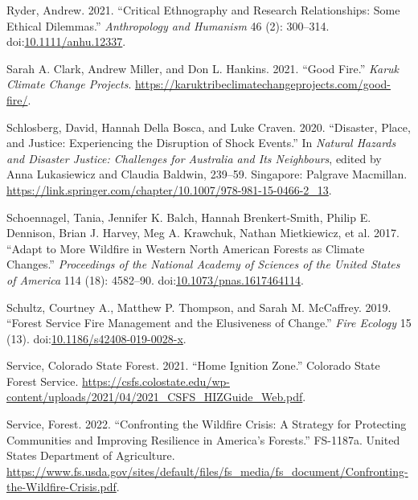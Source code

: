 \documentclass[
]{article}
\newlength{\cslhangindent}
\newenvironment{CSLReferences}[2] %
 {\begin{list}{}{%
  \setlength{\itemindent}{0pt}
  \setlength{\leftmargin}{0pt}
  \setlength{\parsep}{0pt}
  \ifodd #1
   \setlength{\leftmargin}{\cslhangindent}
   \setlength{\itemindent}{-1\cslhangindent}
  \fi
  \setlength{\itemsep}{#2\baselineskip}}}
 {\end{list}}
\begin{document}
\begin{CSLReferences}{1}{0}
Ryder, Andrew. 2021. {``Critical {Ethnography} and {Research Relationships}: {Some Ethical Dilemmas}.''} \emph{Anthropology and Humanism} 46 (2): 300--314. doi:\href{https://doi.org/10.1111/anhu.12337}{10.1111/anhu.12337}.

Sarah A. Clark, Andrew Miller, and Don L. Hankins. 2021. {``Good {Fire}.''} \emph{Karuk Climate Change Projects}. \url{https://karuktribeclimatechangeprojects.com/good-fire/}.

Schlosberg, David, Hannah Della Bosca, and Luke Craven. 2020. {``Disaster, {Place}, and {Justice}: {Experiencing} the {Disruption} of {Shock Events}.''} In \emph{Natural {Hazards} and {Disaster Justice}: {Challenges} for {Australia} and {Its Neighbours}}, edited by Anna Lukasiewicz and Claudia Baldwin, 239--59. Singapore: Palgrave Macmillan. \url{https://link.springer.com/chapter/10.1007/978-981-15-0466-2_13}.

Schoennagel, Tania, Jennifer K. Balch, Hannah Brenkert-Smith, Philip E. Dennison, Brian J. Harvey, Meg A. Krawchuk, Nathan Mietkiewicz, et al. 2017. {``Adapt to More Wildfire in Western {North American} Forests as Climate Changes.''} \emph{Proceedings of the National Academy of Sciences of the United States of America} 114 (18): 4582--90. doi:\href{https://doi.org/10.1073/pnas.1617464114}{10.1073/pnas.1617464114}.

Schultz, Courtney A., Matthew P. Thompson, and Sarah M. McCaffrey. 2019. {``Forest {Service} Fire Management and the Elusiveness of Change.''} \emph{Fire Ecology} 15 (13). doi:\href{https://doi.org/10.1186/s42408-019-0028-x}{10.1186/s42408-019-0028-x}.

Service, Colorado State Forest. 2021. {``Home {Ignition Zone}.''} Colorado State Forest Service. \url{https://csfs.colostate.edu/wp-content/uploads/2021/04/2021_CSFS_HIZGuide_Web.pdf}.

Service, Forest. 2022. {``Confronting the {Wildfire Crisis}: {A Strategy} for {Protecting Communities} and {Improving Resilience} in {America}'s {Forests}.''} FS-1187a. United States Department of Agriculture. \url{https://www.fs.usda.gov/sites/default/files/fs_media/fs_document/Confronting-the-Wildfire-Crisis.pdf}.


\end{CSLReferences}
\end{document}

